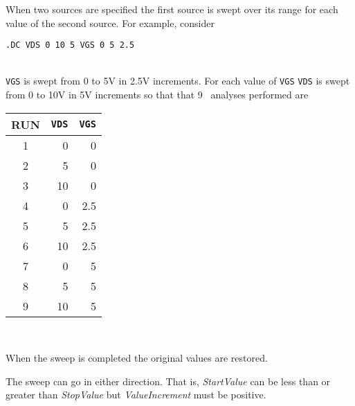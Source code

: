 {\item[5] When two sources are specified the first
source is swept over its range for each  value  of  the
second source. For example, consider\\
\centerline{\tt .DC VDS 0 10 5 VGS 0 5 2.5}\\
{\tt VGS} is swept from 0 to 5V in 2.5V increments.  For each value of {\tt VGS}
{\tt VDS} is swept from 0 to 10V in 5V increments so that that 9 \dc\ analyses
performed are\\[0.1in]
\hspace*{\fill}
\begin{tabular}{|c|r|r|}
\hline
\multicolumn{1}{|c}{RUN}&
\multicolumn{1}{|c}{{\tt VDS}}&
\multicolumn{1}{|c|}{{\tt VGS}}\\
\hline
1 & 0 & 0\\
2 & 5 & 0\\
3 &10 & 0\\
4 & 0 &2.5\\
5 & 5 &2.5\\
6 &10 &2.5\\
7 & 0 & 5\\
8 & 5 & 5\\
9 &10 & 5\\
\hline
\end{tabular}
\hspace*{\fill}\\
\item[6] When the sweep is completed the original values are restored.
\item[7] The sweep can go in either direction. That is,
{\it StartValue} can be less than or greater than {\it StopValue} but
{\it ValueIncrement} must be positive.
}

